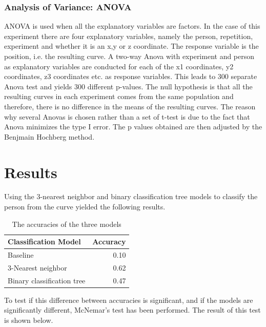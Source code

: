 \documentclass[11pt, fleqn, titlepage]{article}
\begin{document}
\subsubsection*{Analysis of Variance: ANOVA}
ANOVA is used when all the explanatory variables are factors. In the case of this experiment there are four explanatory variables, namely the person, repetition, experiment and whether it is an x,y or z coordinate. The response variable is the position, i.e. the resulting curve. A two-way Anova with experiment and person as explanatory variables are conducted for each of the x1 coordinates, y2 coordinates, z3 coordinates etc. as response variables. This leads to 300 separate Anova test and yields 300 different p-values. The null hypothesis is that all the resulting curves in each experiment comes from the same population and therefore, there is no difference in the means of the resulting curves. The reason why several Anovas is chosen rather than a set of t-test is due to the fact that Anova minimizes the type I error. The p values obtained are then adjusted by the Benjmain Hochberg method. \cite{statbog}


\section{Results}
Using the 3-nearest neighbor and binary classification tree models to classify the person from the curve yielded the following results.

\begin{table}[h]
	\centering
	\begin{tabular}{l r}
		\toprule
		Classification Model       & Accuracy  \\ \midrule
		Baseline                   & 0.10      \\
		3-Nearest neighbor         & 0.62      \\ 
		Binary classification tree & 0.47      \\ \bottomrule
	\end{tabular}
\caption{The accuracies of the three models}
\label{accuracies}
\end{table}

\noindent To test if this difference between accuracies is significant, and if the models are significantly different, McNemar's test has been performed. The result of this test is shown below.
\end{document}
